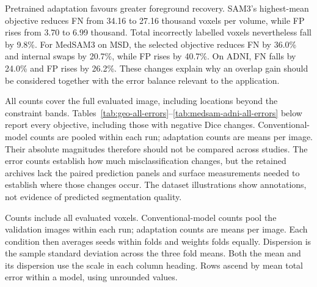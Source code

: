 \documentclass[12pt,a4paper]{article}
\begin{document}
Pretrained adaptation favours greater foreground recovery. SAM3's
highest-mean objective reduces FN from 34.16 to 27.16 thousand voxels
per volume, while FP rises from 3.70 to 6.99 thousand. Total incorrectly
labelled voxels nevertheless fall by 9.8\%. For MedSAM3 on MSD, the
selected objective reduces FN by 36.0\% and internal swaps by 20.7\%,
while FP rises by 40.7\%. On ADNI, FN falls by 24.0\% and FP rises
by 26.2\%. These changes explain why an overlap gain should be considered
together with the error balance relevant to the application.

All counts cover the full evaluated image, including locations beyond
the constraint bands. Tables~\ref{tab:geo-all-errors}--\ref{tab:medsam-adni-all-errors}
below report every objective, including
those with negative Dice changes. Conventional-model counts are pooled
within each run; adaptation counts are means per image. Their absolute
magnitudes therefore should not be compared across studies. The error
counts establish how much misclassification changes, but the retained archives lack the paired
prediction panels and surface measurements needed to establish where
those changes occur. The dataset illustrations show annotations,
not evidence of predicted segmentation quality.

\FloatBarrier

Counts include all evaluated voxels. Conventional-model counts pool the
validation images within each run; adaptation counts are means per image.
Each condition then averages seeds within folds and weights folds equally.
Dispersion is the sample standard deviation across the three fold means.
Both the mean and its dispersion use the scale in each column heading.
Rows ascend by mean total error within a model, using unrounded values.
\end{document}
